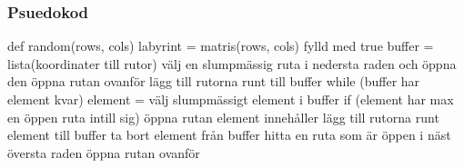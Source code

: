 
\subsubsection{Psuedokod}
\begin{Code}
def random(rows, cols)
	labyrint = matris(rows, cols) fylld med true
	buffer = lista(koordinater till rutor)
	välj en slumpmässig ruta i nedersta raden och öppna den
	öppna rutan ovanför
	lägg till rutorna runt till buffer
	while (buffer har element kvar)
		element = välj slumpmässigt element i buffer
		if (element har max en öppen ruta intill sig)
			öppna rutan element innehåller
			lägg till rutorna runt element till buffer
		ta bort element från buffer
	hitta en ruta som är öppen i näst översta raden
	öppna rutan ovanför
\end{Code}




